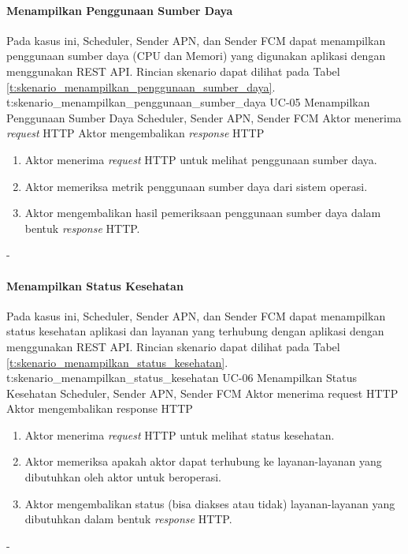 \paragraph{Menampilkan Penggunaan Sumber Daya}
\par Pada kasus ini, Scheduler, Sender APN, dan Sender FCM dapat menampilkan penggunaan sumber daya (CPU dan Memori) yang digunakan aplikasi dengan menggunakan REST API. Rincian skenario dapat dilihat pada Tabel \ref{t:skenario_menampilkan_penggunaan_sumber_daya}.
\tableUcDesc
{t:skenario_menampilkan_penggunaan_sumber_daya}
{UC-05}
{Menampilkan Penggunaan Sumber Daya}
{Scheduler, Sender APN, Sender FCM}
{Aktor menerima \textit{request} HTTP}
{Aktor mengembalikan \textit{response} HTTP}
{
	\begin{enumerate}
		\item Aktor menerima \textit{request} HTTP untuk melihat penggunaan sumber daya.
		\item Aktor memeriksa metrik penggunaan sumber daya dari sistem operasi.
		\item Aktor mengembalikan hasil pemeriksaan penggunaan sumber daya dalam bentuk \textit{response} HTTP.
	\end{enumerate}
}
{-}

\paragraph{Menampilkan Status Kesehatan}
\par Pada kasus ini, Scheduler, Sender APN, dan Sender FCM dapat menampilkan status kesehatan aplikasi dan layanan yang terhubung dengan aplikasi dengan menggunakan REST API. Rincian skenario dapat dilihat pada Tabel \ref{t:skenario_menampilkan_status_kesehatan}.
\tableUcDesc
{t:skenario_menampilkan_status_kesehatan}
{UC-06}
{Menampilkan Status Kesehatan}
{Scheduler, Sender APN, Sender FCM}
{Aktor menerima request HTTP}
{Aktor mengembalikan response HTTP}
{
	\begin{enumerate}
		\item Aktor menerima \textit{request} HTTP untuk melihat status kesehatan.
		\item Aktor memeriksa apakah aktor dapat terhubung ke layanan-layanan yang dibutuhkan oleh aktor untuk beroperasi.
		\item Aktor mengembalikan status (bisa diakses atau tidak) layanan-layanan yang dibutuhkan dalam bentuk \textit{response} HTTP.
	\end{enumerate}
}
{-}

